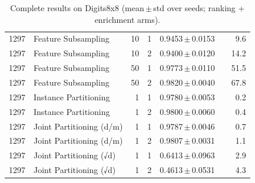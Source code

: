 \begin{table}[ht]
\begin{tabular}{rlrrccr}
1297 & Feature Subsampling & 10 & 1 & 0.9453\,$\pm$\,0.0153 &  & 9.6 \\
1297 & Feature Subsampling & 10 & 2 & 0.9400\,$\pm$\,0.0120 &  & 14.2 \\
1297 & Feature Subsampling & 50 & 1 & 0.9773\,$\pm$\,0.0110 &  & 51.5 \\
1297 & Feature Subsampling & 50 & 2 & 0.9820\,$\pm$\,0.0040 &  & 67.8 \\
1297 & Instance Partitioning & 1 & 1 & 0.9780\,$\pm$\,0.0053 &  & 0.2 \\
1297 & Instance Partitioning & 1 & 2 & 0.9800\,$\pm$\,0.0060 &  & 0.4 \\
1297 & Joint Partitioning (d/m) & 1 & 1 & 0.9787\,$\pm$\,0.0046 &  & 0.7 \\
1297 & Joint Partitioning (d/m) & 1 & 2 & 0.9807\,$\pm$\,0.0031 &  & 1.1 \\
1297 & Joint Partitioning (√d) & 1 & 1 & 0.6413\,$\pm$\,0.0963 &  & 2.9 \\
1297 & Joint Partitioning (√d) & 1 & 2 & 0.4613\,$\pm$\,0.0531 &  & 4.3 \\
\bottomrule
\end{tabular}
\caption{Complete results on Digits8x8 (mean\,$\pm$\,std over seeds; ranking + enrichment arms).}
\label{tab:app_digits8x8}
\end{table}
